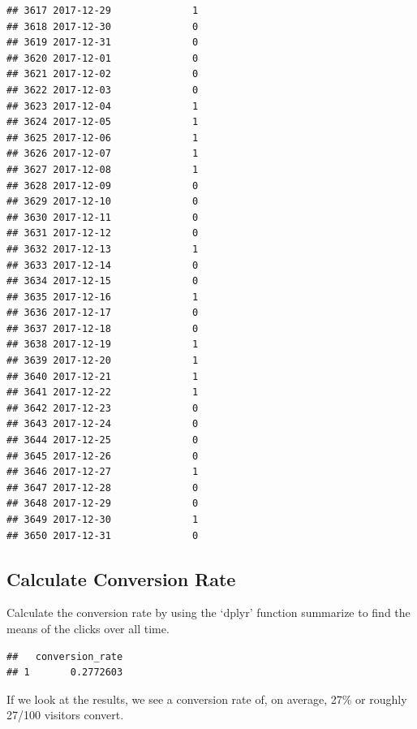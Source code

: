 \documentclass[]{article}
\newenvironment{Shaded}{\begin{snugshade}}{\end{snugshade}}
\newcommand{\KeywordTok}[1]{\textcolor[rgb]{0.13,0.29,0.53}{\textbf{#1}}}
\newcommand{\DataTypeTok}[1]{\textcolor[rgb]{0.13,0.29,0.53}{#1}}
\newcommand{\StringTok}[1]{\textcolor[rgb]{0.31,0.60,0.02}{#1}}
\newcommand{\OperatorTok}[1]{\textcolor[rgb]{0.81,0.36,0.00}{\textbf{#1}}}
\newcommand{\NormalTok}[1]{#1}
\begin{document}
\begin{verbatim}
## 3617 2017-12-29              1
## 3618 2017-12-30              0
## 3619 2017-12-31              0
## 3620 2017-12-01              0
## 3621 2017-12-02              0
## 3622 2017-12-03              0
## 3623 2017-12-04              1
## 3624 2017-12-05              1
## 3625 2017-12-06              1
## 3626 2017-12-07              1
## 3627 2017-12-08              1
## 3628 2017-12-09              0
## 3629 2017-12-10              0
## 3630 2017-12-11              0
## 3631 2017-12-12              0
## 3632 2017-12-13              1
## 3633 2017-12-14              0
## 3634 2017-12-15              0
## 3635 2017-12-16              1
## 3636 2017-12-17              0
## 3637 2017-12-18              0
## 3638 2017-12-19              1
## 3639 2017-12-20              1
## 3640 2017-12-21              1
## 3641 2017-12-22              1
## 3642 2017-12-23              0
## 3643 2017-12-24              0
## 3644 2017-12-25              0
## 3645 2017-12-26              0
## 3646 2017-12-27              1
## 3647 2017-12-28              0
## 3648 2017-12-29              0
## 3649 2017-12-30              1
## 3650 2017-12-31              0
\end{verbatim}

\subsection{Calculate Conversion Rate}\label{calculate-conversion-rate}

Calculate the conversion rate by using the `dplyr' function summarize to
find the means of the clicks over all time.

\begin{Shaded}
\end{Shaded}

\begin{verbatim}
##   conversion_rate
## 1       0.2772603
\end{verbatim}

If we look at the results, we see a conversion rate of, on average, 27\%
or roughly 27/100 visitors convert.
\end{document}
